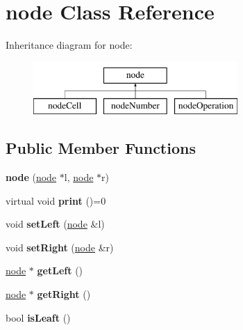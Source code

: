 \hypertarget{classnode}{\section{node \-Class \-Reference}
\label{classnode}
}
\-Inheritance diagram for node\-:\begin{figure}[H]
\begin{center}
\leavevmode
\includegraphics[height=2.000000cm]{classnode}
\end{center}
\end{figure}
\subsection*{\-Public \-Member \-Functions}
\begin{DoxyCompactItemize}
\item 
\hypertarget{classnode_a465d20a0fd78417c48cfd8f5d180b2b0}{{\bfseries node} (\hyperlink{classnode}{node} $\ast$l, \hyperlink{classnode}{node} $\ast$r)}\label{classnode_a465d20a0fd78417c48cfd8f5d180b2b0}

\item 
\hypertarget{classnode_ae52863436839f14b472f23f1329336b9}{virtual void {\bfseries print} ()=0}\label{classnode_ae52863436839f14b472f23f1329336b9}

\item 
\hypertarget{classnode_a9b722c499ed044f78994f0b127d881d6}{void {\bfseries set\-Left} (\hyperlink{classnode}{node} \&l)}\label{classnode_a9b722c499ed044f78994f0b127d881d6}

\item 
\hypertarget{classnode_a8bf000b22bc03985f8900796f4b78205}{void {\bfseries set\-Right} (\hyperlink{classnode}{node} \&r)}\label{classnode_a8bf000b22bc03985f8900796f4b78205}

\item 
\hypertarget{classnode_aceb9777e547369f516b09706ad7b04f5}{\hyperlink{classnode}{node} $\ast$ {\bfseries get\-Left} ()}\label{classnode_aceb9777e547369f516b09706ad7b04f5}

\item 
\hypertarget{classnode_a39b2ccdd69f93c1cdbd02fdcc2cbca1a}{\hyperlink{classnode}{node} $\ast$ {\bfseries get\-Right} ()}\label{classnode_a39b2ccdd69f93c1cdbd02fdcc2cbca1a}

\item 
\hypertarget{classnode_a201ab2cf23ce0251f9586103e51cdb3c}{bool {\bfseries is\-Leaft} ()}\label{classnode_a201ab2cf23ce0251f9586103e51cdb3c}

\end{DoxyCompactItemize}
